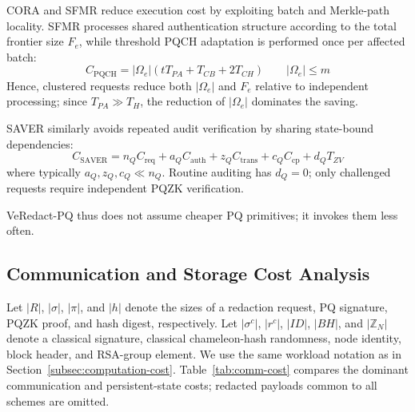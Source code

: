 \documentclass[lettersize,journal]{IEEEtran}
\begin{document}
CORA and SFMR reduce execution cost by exploiting batch and Merkle-path
locality. SFMR processes shared authentication structure according to
the total frontier size $F_e$, while threshold PQCH adaptation is
performed once per affected batch:
\begin{equation}
C_{\mathrm{PQCH}}
=
|\Omega_e|(tT_{PA}+T_{CB}+2T_{CH})
\qquad |\Omega_e|\leq m
\end{equation}
Hence, clustered requests reduce both $|\Omega_e|$ and $F_e$ relative
to independent processing; since $T_{PA}\gg T_H$, the reduction of
$|\Omega_e|$ dominates the saving.

SAVER similarly avoids repeated audit verification by sharing
state-bound dependencies:
\begin{equation}
C_{\mathrm{SAVER}}
=
n_QC_{\mathrm{req}}
+a_QC_{\mathrm{auth}}
+z_QC_{\mathrm{trans}}
+c_QC_{\mathrm{cp}}
+d_QT_{ZV}
\label{eq:saver_cost}
\end{equation}
where typically $a_Q,z_Q,c_Q\ll n_Q$. Routine auditing has $d_Q=0$;
only challenged requests require independent PQZK verification.

VeRedact-PQ thus does not assume cheaper PQ primitives; it invokes them
less often.


\subsection{Communication and Storage Cost Analysis}
\label{subsec:communication-cost}

Let $|R|$, $|\sigma|$, $|\pi|$, and $|h|$ denote the sizes of a
redaction request, PQ signature, PQZK proof, and hash digest,
respectively. Let $|\sigma^{c}|$, $|r^{c}|$, $|ID|$, $|BH|$, and
$|\mathbb{Z}_N|$ denote a classical signature, classical
chameleon-hash randomness, node identity, block header, and RSA-group
element. We use the same workload notation as in
Section~\ref{subsec:computation-cost}. Table~\ref{tab:comm-cost}
compares the dominant communication and persistent-state costs;
redacted payloads common to all schemes are omitted.
\end{document}

